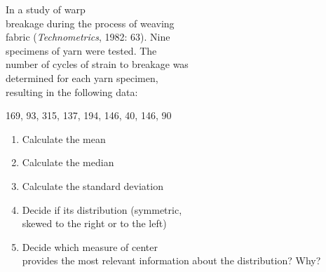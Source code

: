 \documentclass[11pt]{book}\usepackage[]{graphicx}\usepackage[]{color}
\begin{document}
\begin{exercises}
\begin{exercise}
\end{exercise}
\begin{solution}  %



\end{solution}



\begin{exercise} %



In a study of warp \\ breakage during the process of weaving \\ fabric (\textit{Technometrics}, 1982: 63).  Nine \\ specimens of yarn were tested.  The \\ number of cycles of strain to breakage was \\ determined for each yarn specimen, \\ resulting in the following  data:

\vspace{3mm}

{\small{
169, 93, 315, 137, 194, 146, 40, 146, 90 
}}


\begin{enumerate}
\item Calculate the mean
\item Calculate the median
\item Calculate the standard deviation
\item Decide if its distribution (symmetric, \\ skewed to the right or to the left)
\item Decide which measure of center \\ provides the most relevant information about the distribution? Why?
\end{enumerate}

\end{exercise}
\begin{solution}   %


\end{solution}
\end{exercises}
\end{document}
